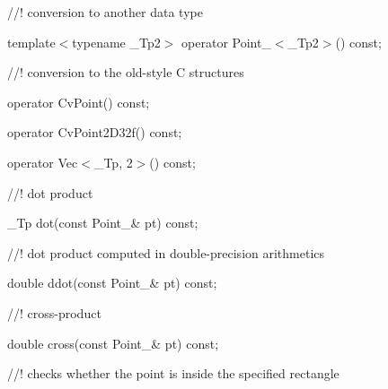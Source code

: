 {\ttfamily }

{\ttfamily }

{\ttfamily //! conversion to another data type}

{\ttfamily }

{\ttfamily }

{\ttfamily template$<$typename \+\_\+\+Tp2$>$ operator Point\+\_\+$<$\+\_\+\+Tp2$>$() const;}

{\ttfamily }

{\ttfamily }

{\ttfamily //! conversion to the old-\/style C structures}

{\ttfamily }

{\ttfamily }

{\ttfamily operator Cv\+Point() const;}

{\ttfamily }

{\ttfamily }

{\ttfamily operator Cv\+Point2\+D32f() const;}

{\ttfamily }

{\ttfamily }

{\ttfamily operator Vec$<$\+\_\+\+Tp, 2$>$() const;}

{\ttfamily }

{\ttfamily }

{\ttfamily //! dot product}

{\ttfamily }

{\ttfamily }

{\ttfamily \+\_\+\+Tp dot(const Point\+\_\+\& pt) const;}

{\ttfamily }

{\ttfamily }

{\ttfamily //! dot product computed in double-\/precision arithmetics}

{\ttfamily }

{\ttfamily }

{\ttfamily double ddot(const Point\+\_\+\& pt) const;}

{\ttfamily }

{\ttfamily }

{\ttfamily //! cross-\/product}

{\ttfamily }

{\ttfamily }

{\ttfamily double cross(const Point\+\_\+\& pt) const;}

{\ttfamily }

{\ttfamily }

{\ttfamily //! checks whether the point is inside the specified rectangle}

